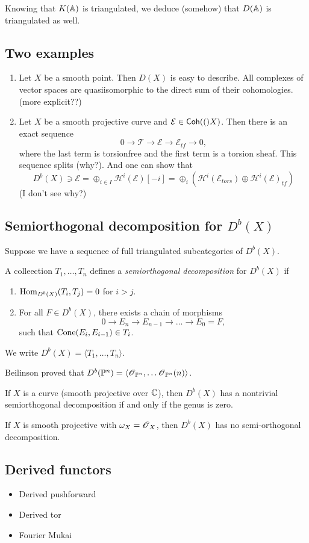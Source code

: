 \documentclass[11pt, english]{article}
\begin{document}
Knowing that $K(\mathbb{A})$ is triangulated, we deduce (somehow) that $D(\mathbb{A})$ is triangulated as well.

\subsection{Two examples}

\begin{enumerate}
	\item Let $X$ be a smooth point. Then $D(X)$ is easy to describe. All complexes of vector spaces are quasiisomorphic to the direct sum of their cohomologies. (more explicit??)
	\item Let $X$ be a smooth projective curve and $\mathcal E \in \mathsf{Coh}({(})X)$. Then there is an exact sequence
\[
0 \to \mathcal T \to \mathcal E \to \mathcal E_{tf} \to 0,
\]
where the last term is torsionfree and the first term is a torsion sheaf. This sequence splits (why?). And one can show that
\[
D^b(X) \ni \mathcal E = \oplus_{i \in I} \mathscr H^i(\mathcal E)[-i]  = \oplus_i (\mathscr H^i(\mathcal E_{tors}) \oplus \mathscr H^i(\mathcal E)_{tf})
\]
(I don't see why?)
\end{enumerate}

\subsection{Semiorthogonal decomposition for $D^b(X)$}

Suppose we have a sequence of full triangulated subcategories of $D^b(X)$.

\begin{defi}
A colleection $T_1,\ldots,T_n$  defines a \emph{semiorthogonal decomposition} for $D^b(X)$ if
\begin{enumerate}
	\item $\operatorname{Hom}_{D^b(X)}(T_i,T_j)=0$ for $i > j$.
	\item For all $F \in D^b(X)$, there exists a chain of morphisms
	$$
0 \to E_n \to E_{n-1} \to \ldots \to E_0=F,
	$$
	such that $\operatorname{Cone}(E_i,E_{i-1}) \in T_i$.
\end{enumerate}
\end{defi}
We write $D^b(X) = \langle T_1, \ldots, T_n \rangle$.

\begin{example}
Beilinson proved that $D^b(\mathbb{P}^n)=\langle \operatorname{\mathscr{O}}_{\mathbb{P}^n} ,\ldots \operatorname{\mathscr{O}}_{\mathbb{P}^n}(n) \rangle$.
\end{example}

\begin{example}
If $X$ is a curve (smooth projective over $\mathbb{C}$), then $D^b(X)$ has a nontrivial semiorthogonal decomposition if and only if the genus is zero.
\end{example}

\begin{example}
If $X$ is smooth projective with $\omega_X=\operatorname{\mathscr{O}}_X$, then $D^b(X)$ has no semi-orthogonal decomposition.
\end{example}

\subsection{Derived functors}

\begin{itemize}
\item Derived pushforward
\item Derived tor
\item Fourier Mukai
\end{itemize}
\end{document}
